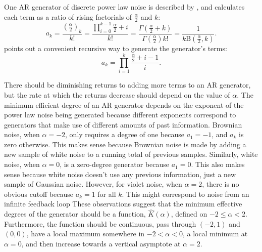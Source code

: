 \documentclass[preprint]{JASA}
\begin{document}
One AR generator of discrete power law noise is described by \citet{kasdin_walter:1992}, and calculates each term as a ratio of rising factorials of $\frac{\alpha}{2}$ and $k$:
\begin{equation}
  a_k = \frac{(\frac{\alpha}{2})_k}{k!} = \frac{\prod_{i=0}^{k-1}{\frac{\alpha}{2}+i}}{k!} = \frac{\Gamma(\frac{\alpha}{2}+k)}{\Gamma(\frac{\alpha}{2})k!}=\frac{1}{k\mathrm{B}(\frac{\alpha}{2},k)}\text{.}
\end{equation}
\citet{kasdin1995discrete} points out a convenient recursive way to generate the generator's terms:
\begin{equation}
  a_k = \prod_{i=1}^{k}\frac{\frac{\alpha}{2}+i-1}{i}\text{.}
\end{equation}

There should be diminishing returns to adding more terms to an AR generator, but the rate at which the returns decrease should depend on the value of $\alpha$.
The minimum efficient degree of an AR generator depends on the exponent of the power law noise being generated because different exponents correspond to generators that make use of different amounts of past information.
Brownian noise, when $\alpha = -2$, only requires a degree of one because $a_1 = -1$, and $a_k$ is zero otherwise.
This makes sense because Brownian noise is made by adding a new sample of white noise to a running total of previous samples.
Similarly, white noise, when $\alpha = 0$, is a zero-degree generator because $a_1 = 0$.
This also makes sense because white noise doesn't use any previous information, just a new sample of Gaussian noise.
However, for violet noise, when $\alpha = 2$, there is no obvious cutoff because $a_k = 1$ for all $k$.
This might correspond to noise from an infinite feedback loop
These observations suggest that the minimum effective degrees of the generator should be a function, $\hat{K}(\alpha)$, defined on $-2 \le \alpha < 2$.
Furthermore, the function should be continuous, pass through $(-2, 1)$ and $(0, 0)$, have a local maximum somewhere in $-2 < \alpha < 0$, a local minimum at $\alpha = 0$, and then increase towards a vertical asymptote at $\alpha=2$.
\end{document}
